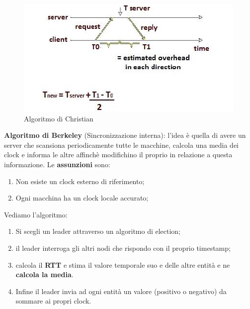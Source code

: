 \documentclass[12pt]{article}
\begin{document}
			\begin{figure}[h!]
				\centering
				\includegraphics[scale=0.60]{img/christian.png}
				\caption{Algoritmo di Christian}
			\end{figure}
			\textbf{Algoritmo di Berkeley} (Sincronizzazione interna): l'idea è quella di avere un server che scansiona periodicamente tutte le macchine, calcola una media dei clock e informa le altre affinchè modifichino il proprio in relazione a questa informazione. Le \textbf{assunzioni} sono:
			\begin{enumerate}
				\item Non esiste un clock esterno di riferimento;
				\item Ogni macchina ha un clock locale accurato;
			\end{enumerate}
			Vediamo l'algoritmo:
			\begin{enumerate}
				\item Si scegli un leader attraverso un algoritmo di election;
				\item il leader interroga gli altri nodi che rispondo con il proprio timestamp;
				\item calcola il \textbf{RTT} e stima il valore temporale suo e delle altre entità e ne \textbf{calcola la media}.
				\item Infine il leader invia ad ogni entità un valore (positivo o negativo) da sommare ai propri clock. 
			\end{enumerate}
\end{document}
